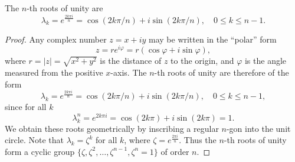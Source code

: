 \begin{theorem}
  \label{root_of_unity}
  The $n$-th roots of unity are
  \[
  \lambda_k = e^{\frac{2k\pi i}{n}} = \cos(2k\pi/n) + i \sin(2k\pi/n), \quad 0 \le k \le n - 1.
  \]
\end{theorem}
\begin{proof}
  Any complex number $z = x + iy$ may be written in the ``polar'' form
  \[
  z = r e^{i\varphi} = r(\cos \varphi + i \sin \varphi),
  \]
  where $r = |z| = \sqrt{x^2 + y^2}$ is the distance of $z$ to the origin,
  and $\varphi$ is the angle measured from the positive $x$-axis.
  The $n$-th roots of unity are therefore of the form
  \[
  \lambda_k = e^{\frac{2k\pi i}{n}} = \cos(2k\pi/n) + i \sin(2k\pi/n), \quad 0 \le k \le n - 1,
  \]
  since for all $k$
  \[
  \lambda_k^n = e^{2k\pi i} = \cos(2k\pi) + i \sin(2k\pi) = 1.
  \]
  We obtain these roots geometrically by inscribing a regular $n$-gon into the unit circle.
  Note that $\lambda_k = \zeta^k$ for all $k$, where $\zeta = e^{\frac{2\pi i}{n}}$.
  Thus the $n$-th roots of unity form a cyclic group $\{\zeta, \zeta^2, \dots, \zeta^{n-1}, \zeta^n = 1\}$ of order $n$.
\end{proof}

